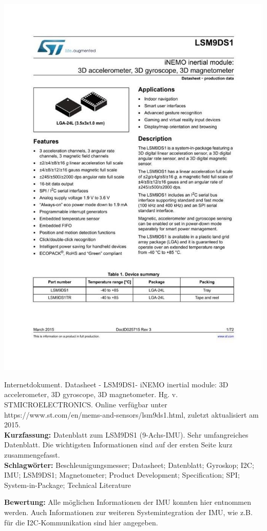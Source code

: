 {
\begin{minipage}{0.38\textwidth}
	\includegraphics[width=\linewidth]{images/STM.jpg}
\end{minipage}
\hfill
\begin{minipage}{0.6\textwidth}
Internetdokument. Datasheet - LSM9DS1- iNEMO inertial module: 3D accelerometer, 3D gyroscope, 3D magnetometer.	Hg. v. STMICROELECTRONICS. Online verfügbar unter https://www.st.com/en/mems-and-sensors/lsm9ds1.html, zuletzt aktualisiert am 2015.
\\ \textbf{Kurzfassung:}
Datenblatt zum LSM9DS1 (9-Achs-IMU). Sehr umfangreiches Datenblatt. Die wichtigsten Informationen sind auf der ersten Seite kurz zusammengefasst.
\\ \textbf{Schlagwörter:}
Beschleunigungsmesser; Datasheet; Datenblatt; Gyroskop; I2C; IMU; LSM9DS1; Magnetometer; Product Development; Specification; SPI; System-in-Package; Technical Literature
\end{minipage}
\textbf{Bewertung:}
Alle möglichen Informationen der IMU konnten hier entnommen werden. Auch Informationen zur weiteren Systemintegration der IMU, wie z.B. für die I2C-Kommunikation sind hier angegeben.
}

